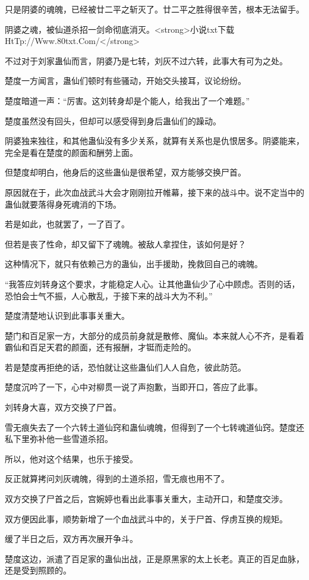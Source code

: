 \begin{this_body}
只是阴婆的魂魄，已经被廿二平之斩灭了。廿二平之胜得很辛苦，根本无法留手。

阴婆之魂，被仙道杀招一剑命彻底消灭。<strong>小说txt下载HtTp://Www.80txt.Com/</strong>

不过对于刘家蛊仙而言，阴婆乃是七转，刘灰不过六转，此事大有可为之处。

楚度一方闻言，蛊仙们顿时有些骚动，开始交头接耳，议论纷纷。

楚度暗道一声：“厉害。这刘转身却是个能人，给我出了一个难题。”

楚度虽然没有回头，但却可以感受得到身后蛊仙们的躁动。

阴婆独来独往，和其他蛊仙没有多少关系，就算有关系也是仇恨居多。阴婆能来，完全是看在楚度的颜面和酬劳上面。

但楚度却明白，他身后的这些蛊仙是很希望，双方能够交换尸首。

原因就在于，此次血战武斗大会才刚刚拉开帷幕，接下来的战斗中。说不定当中的蛊仙就要落得身死魂消的下场。

若是如此，也就罢了，一了百了。

但若是丧了性命，却又留下了魂魄。被敌人拿捏住，该如何是好？

这种情况下，就只有依赖己方的蛊仙，出手援助，挽救回自己的魂魄。

“我答应刘转身这个要求，才能稳定人心。让其他蛊仙少了心中顾虑。否则的话，恐怕会士气不振，人心散乱，于接下来的战斗大为不利。”

楚度清楚地认识到此事事关重大。

楚门和百足家一方，大部分的成员前身就是散修、魔仙。本来就人心不齐，是看着霸仙和百足天君的颜面，还有报酬，才铤而走险的。

若是楚度再拒绝的话，恐怕就让这些蛊仙们人人自危，彼此防范。

楚度沉吟了一下，心中对柳贯一说了声抱歉，当即开口，答应了此事。

刘转身大喜，双方交换了尸首。

雪无痕失去了一个六转土道仙窍和蛊仙魂魄，但得到了一个七转魂道仙窍。楚度还私下里弥补他一些雪道杀招。

所以，他对这个结果，也乐于接受。

反正就算拷问刘灰魂魄，得到的土道杀招，雪无痕也用不了。

双方交换了尸首之后，宫婉婷也看出此事事关重大，主动开口，和楚度交涉。

双方便因此事，顺势新增了一个血战武斗中的，关于尸首、俘虏互换的规矩。

缓了半日之后，双方再次展开争斗。

楚度这边，派遣了百足家的蛊仙出战，正是原黑家的太上长老。真正的百足血脉，还是受到照顾的。


\end{this_body}
